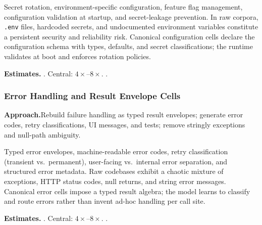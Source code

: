 Secret rotation, environment-specific configuration, feature flag
management, configuration validation at startup, and secret-leakage
prevention.  In raw corpora, \texttt{.env} files, hardcoded secrets,
and undocumented environment variables constitute a persistent security
and reliability risk.  Canonical configuration cells declare the
configuration schema with types, defaults, and secret classifications;
the runtime validates at boot and enforces rotation policies.

\smallskip\noindent
\textbf{Estimates.}\quad
{}.\quad
Central: $4\times$--$8\times$.\quad
{}.

\subsubsection{Error Handling and Result Envelope Cells}
\label{ssec:error-cells}

\smallskip\noindent
\textbf{Approach.}\quad Rebuild failure handling as typed result envelopes; generate error codes, retry classifications, UI messages, and tests; remove stringly exceptions and null-path ambiguity.

Typed error envelopes, machine-readable error codes, retry
classification (transient vs.\ permanent), user-facing vs.\ internal
error separation, and structured error metadata.  Raw codebases exhibit
a chaotic mixture of exceptions, HTTP status codes, null returns, and
string error messages.  Canonical error cells impose a typed result
algebra; the model learns to classify and route errors rather than
invent ad-hoc handling per call site.

\smallskip\noindent
\textbf{Estimates.}\quad
{}.\quad
Central: $4\times$--$8\times$.\quad
{}.


